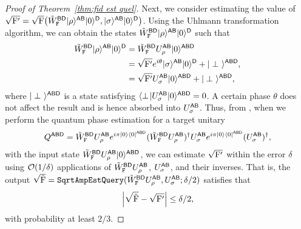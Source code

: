 \begin{proof}[Proof of Theorem~\ref{thm:fid est quel}]
Next, we consider estimating the value of $\sqrt{\rF'} = \sqrt{\rF}\big(\til{W}_\tF^{\sB\sD}\ket{\rho}^{\sA\sB}\ket{0}^\sD, \ket{\sigma}^{\sA\sB}\ket{0}^\sD\big)$. 
Using the Uhlmann transformation algorithm, we can obtain the states $\til{W}_\tF^{\sB\sD}\ket{\rho}^{\sA\sB}\ket{0}^{\sD}$ such that
\begin{align}
    \label{inteq:170}
    \til{W}_\tF^{\sB\sD}\ket{\rho}^{\sA\sB}\ket{0}^{\sD}
    &= \til{W}_\tF^{\sB\sD}U_\rho^{\sA\sB}\ket{0}^{\sA\sB\sD}    \\
    &= \sqrt{\rF'}e^{i\theta}\ket{\sigma}^{\sA\sB}\ket{0}^{\sD} + \ket{\perp~}^{\sA\sB\sD}, \\
    &= \sqrt{\rF'}U_\sigma^{\sA\sB}\ket{0}^{\sA\sB\sD} + \ket{\perp~}^{\sA\sB\sD},
\end{align}
where $\ket{\perp~}^{\sA\sB\sD}$ is a state satisfying $\bra{\perp\!}U_\sigma^{\sA\sB}\ket{0}^{\sA\sB\sD} = 0$.
A certain phase $\theta$ does not affect the result and is hence absorbed into $U_\sigma^{\sA\sB}$.
Thus, from , when we perform the quantum phase estimation for a target unitary
\begin{align}
\label{inteq:48}
    Q^{\sA\sB\sD} = \til{W}_\tF^{\sB\sD}U_\rho^{\sA\sB}e^{i\pi\ketbra{0}{0}^{\sA\sB\sD}}(\til{W}_\tF^{\sB\sD}U_\rho^{\sA\sB})^\dag U_\sigma^{\sA\sB}e^{i\pi\ketbra{0}{0}^{\sA\sB\sD}}(U_\sigma^{\sA\sB})^\dag,
\end{align}
with the input state $\til{W}_\tF^{\sB\sD}U_\rho^{\sA\sB} \ket{0}^{\sA\sB\sD}$, we can estimate $\sqrt{\rF'}$ within the error $\delta$ using $\cO(1/\delta)$ applications of $\til{W}_\tF^{\sB\sD}U_\rho^{\sA\sB}$, $U_\sigma^{\sA\sB}$, and their inverses.
That is, the output $\sqrt{\til{\rF}} = \mathtt{SqrtAmpEstQuery}(\til{W}_\tF^{\sB\sD}U_\rho^{\sA\sB}, U_\sigma^{\sA\sB}; \delta/2)$ satisfies that 
\begin{align}
\label{inteq:54}
    \Big|\sqrt{\til{\rF}} - \sqrt{\rF'}\Big| \leq \delta/2,
\end{align}
with probability at least $2/3$.



\end{proof}
